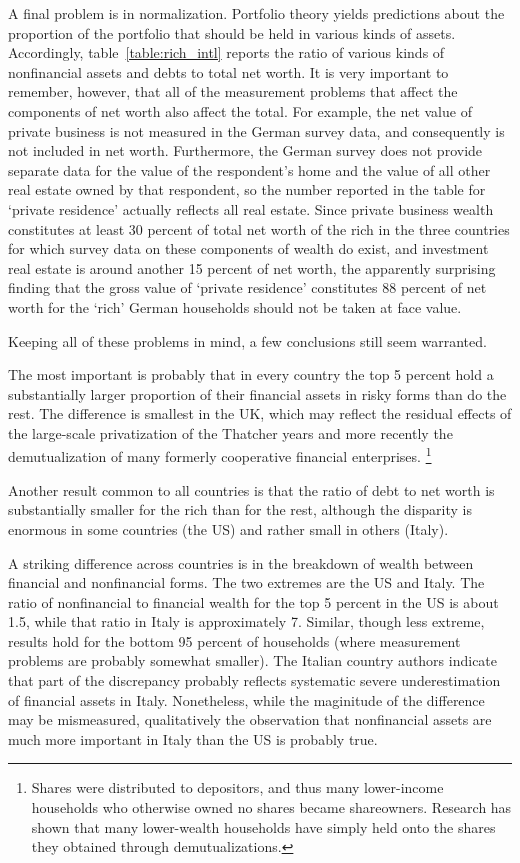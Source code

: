 \documentclass[12pt]{article}
\begin{document}
A final problem is in normalization. Portfolio theory yields predictions
about the proportion of the portfolio that should be held in various kinds
of assets. Accordingly, table~\ref{table:rich_intl} reports the ratio of
various kinds of nonfinancial assets and debts to total net worth. It is
very important to remember, however, that all of the measurement problems
that affect the components of net worth also affect the total. For example,
the net value of private business is not measured in the German survey data,
and consequently is not included in net worth. Furthermore, the German
survey does not provide separate data for the value of the respondent's home
and the value of all other real estate owned by that respondent, so the
number reported in the table for `private residence' actually reflects all
real estate. Since private business wealth constitutes at least 30 percent
of total net worth of the rich in the three countries for which survey data
on these components of wealth do exist, and investment real estate is around
another 15 percent of net worth, the apparently surprising finding that the
gross value of `private residence' constitutes 88 percent of net worth for
the `rich' German households should not be taken at face value.

Keeping all of these problems in mind, a few conclusions still seem
warranted.

The most important is probably that in every country the top 5 percent hold
a substantially larger proportion of their financial assets in risky forms
than do the rest. The difference is smallest in the UK, which may reflect
the residual effects of the large-scale privatization of the Thatcher years
and more recently the demutualization of many formerly cooperative financial
enterprises. \footnote{%
Shares were distributed to depositors, and thus many lower-income households
who otherwise owned no shares became shareowners. Research has shown that
many lower-wealth households have simply held onto the shares they obtained
through demutualizations.}

Another result common to all countries is that the ratio of debt to net
worth is substantially smaller for the rich than for the rest, although the
disparity is enormous in some countries (the US) and rather small in others
(Italy).

A striking difference across countries is in the breakdown of wealth between
financial and nonfinancial forms. The two extremes are the US and Italy. The
ratio of nonfinancial to financial wealth for the top 5 percent in the US is
about 1.5, while that ratio in Italy is approximately 7. Similar, though
less extreme, results hold for the bottom 95 percent of households (where
measurement problems are probably somewhat smaller). The Italian country
authors indicate that part of the discrepancy probably reflects systematic
severe underestimation of financial assets in Italy. Nonetheless, while the
maginitude of the difference may be mismeasured, qualitatively the
observation that nonfinancial assets are much more important in Italy than
the US is probably true.
\end{document}
